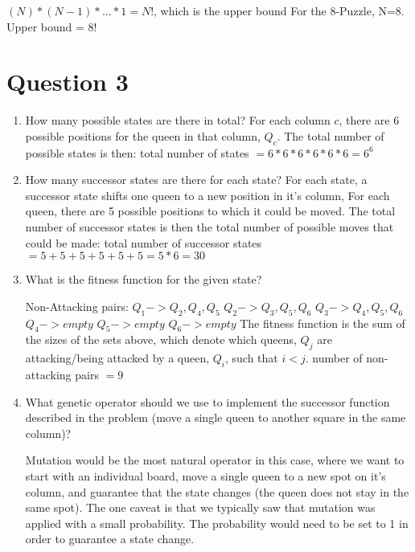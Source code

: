\documentclass{article}
\begin{document}
    $(N) * (N-1) * ... * 1 = N!$, which is the upper bound
    \newline
    For the 8-Puzzle, N=8. 
    \newline Upper bound = $8!$
    
    \newpage
    \section*{Question 3}
    \begin{enumerate}
        \item How many possible states are there in total?
        \newline
        For each column $c$, there are 6 possible positions for the queen in that column, $Q_c$. The total number of possible states is then:
        \newline
        total number of states $= 6 * 6 * 6 * 6 * 6 * 6 = 6^6$
        
        \item How many successor states are there for each state?
        \newline
        For each state, a successor state shifts one queen to a new position in it's column, For each queen, there are 5 possible positions to which it could be moved. The total number of successor states is then the total number of possible moves that could be made:
        \newline
        total number of successor states $= 5 + 5 + 5 + 5 + 5 + 5 = 5 * 6 = 30$
        
        \item What is the fitness function for the given state?
        
        Non-Attacking pairs:
        \newline
        $Q_1 -> { Q_2, Q_4, Q_5 }$
        \newline
        $Q_2 -> { Q_3, Q_5, Q_6 }$
        \newline
        $Q_3 -> { Q_4, Q_5, Q_6 }$
        \newline
        $Q_4 -> {empty}$
        \newline
        $Q_5 -> {empty}$
        \newline
        $Q_6 -> {empty}$
        \newline
        The fitness function is the sum of the sizes of the sets above, which denote which queens, $Q_j$ are attacking/being attacked by a queen, $Q_i$, such that $i<j$.
        \newline
        number of non-attacking pairs $ = 9$
        \item What genetic operator should we use to implement the successor function described in the problem (move a single queen to another square in the same column)?
        
        Mutation would be the most natural operator in this case, where we want to start with an individual board, move a single queen to a new spot on it's column, and guarantee that the state changes (the queen does not stay in the same spot). The one caveat is that we typically saw that mutation was applied with a small probability. The probability would need to be set to 1 in order to guarantee a state change.
    \end{enumerate}
    \newpage
\end{document}
